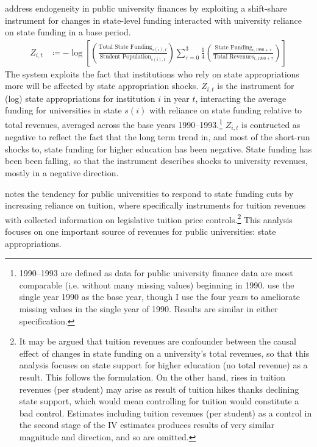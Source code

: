 \cite{NBERw23736,chakrabarti2018effect,NBERw27885} address endogeneity in public university finances by exploiting a shift-share instrument for changes in state-level funding interacted with university reliance on state funding in a base period.
\begin{align}
    \label{eqn:public-instrument}
    Z_{i,t} &\coloneqq - \log \left[
    \left( \frac{\text{Total State Funding}_{s(i),t}}{\text{Student Population}_{s(i),t}} \right)
    \sum_{\tau = 0}^{3} \frac 14
    \left( \frac{\text{State Funding}_{i,1990 + \tau}}{\text{Total Revenues}_{i,1990 + \tau}} \right) \right]
\end{align}
The system exploits the fact that institutions who rely on state appropriations more will be affected by state appropriation shocks.
$Z_{i,t}$ is the instrument for (log) state appropriations for institution $i$ in year $t$, interacting the average funding for universities in state $s(i)$ with reliance on state funding relative to total revenues, averaged across the base years 1990--1993.\footnote{
    1990--1993 are defined as data for public university finance data are most comparable (i.e. without many missing values) beginning in 1990.
    \cite{NBERw23736} use the single year 1990 as the base year, though I use the four years to ameliorate missing values in the single year of 1990.
    Results are similar in either specification.
}
$Z_{i,t}$ is contructed as negative to reflect the fact that the long term trend in, and most of the short-run shocks to, state funding for higher education has been negative.
State funding has been been falling, so that the instrument describes shocks to university revenues, mostly in a negative direction.

\cite{NBERw27885} notes the tendency for public universities to respond to state funding cuts by increasing reliance on tuition, where \cite{NBERw23736} specifically instruments for tuition revenues with collected information on legislative tuition price controls.\footnote{
    \label{foot:control}
    It may be argued that tuition revenues are confounder between the causal effect of changes in state funding on a university's total revenues, so that this analysis focuses on state support for higher education (no total revenue) as a result.
    This follows the \cite{NBERw27885} formulation.
    On the other hand, rises in tuition revenues (per student) may arise as result of tuition hikes thanks declining state support, which would mean controlling for tuition would constitute a bad control.
    Estimates including tuition revenues (per student) as a control in the second stage of the IV estimates produces results of very similar magnitude and direction, and so are omitted.
}
This analysis focuses on one important source of revenues for public universities: state appropriations.

